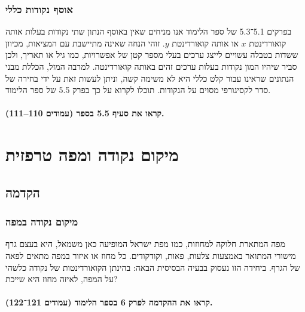 \documentclass[
]{book}
\begin{document}
\hypertarget{general-pos}{%
\subsection{אוסף נקודות כללי}\label{general-pos}}

בפרקים 5.1־5.3 של ספר הלימוד אנו מניחים שאין באוסף הנתון שתי נקודות בעלות אותה קואורדינטת \(x\) או אותה קואורדינטת \(y\). זוהי הנחה שאינה מתיישבת עם המציאות, מכיוון ששדות בטבלה עשויים לייצג ערכים בעלי מספר קטן של אפשרויות, כמו גיל או תאריך, ולכן סביר שיהיו המון נקודות בעלות ערכים זהים באותה קואורדינטה. למרבה המזל, הכללת מבני הנתונים שראינו עבור קלט כללי היא לא משימה קשה, וניתן לעשות זאת על ידי בחירה של סדר לקסיגורפי מסוים על הנקודות. תוכלו לקרוא על כך בפרק 5.5 של ספר הלימוד.

\hypertarget{ux5e7ux5e8ux5d0ux5d5-ux5d0ux5ea-ux5e1ux5e2ux5d9ux5e3-5.5-ux5d1ux5e1ux5e4ux5e8-ux5e2ux5deux5d5ux5d3ux5d9ux5dd-110111.}{%
\subsubsection*{קראו את סעיף 5.5 בספר (עמודים 110--111).}\label{ux5e7ux5e8ux5d0ux5d5-ux5d0ux5ea-ux5e1ux5e2ux5d9ux5e3-5.5-ux5d1ux5e1ux5e4ux5e8-ux5e2ux5deux5d5ux5d3ux5d9ux5dd-110111.}}

\hypertarget{point-location}{%
\chapter{מיקום נקודה ומפה טרפזית}\label{point-location}}

\hypertarget{preface}{%
\section{הקדמה}\label{preface}}

\hypertarget{point-on-map}{%
\subsection{מיקום נקודה במפה}\label{point-on-map}}

מפה המתארת חלוקה למחוזות, כמו מפת ישראל המופיעה כאן משמאל, היא בעצם גרף מישורי המתואר באמצעות צלעות, פאות, וקודקודים.
כל מחוז או איזור במפה מתאים לפאה של הגרף.
ביחידה הזו נעסוק בבעיה הבסיסית הבאה: בהינתן הקואורדינטות של נקודה כלשהי על המפה, לאיזה מחוז היא שייכת?

\hypertarget{ux5e7ux5e8ux5d0ux5d5-ux5d0ux5ea-ux5d4ux5d4ux5e7ux5d3ux5deux5d4-ux5dcux5e4ux5e8ux5e7-6-ux5d1ux5e1ux5e4ux5e8-ux5d4ux5dcux5d9ux5deux5d5ux5d3-ux5e2ux5deux5d5ux5d3ux5d9ux5dd-121122.}{%
\subsubsection*{קראו את ההקדמה לפרק 6 בספר הלימוד (עמודים 121־122).}\label{ux5e7ux5e8ux5d0ux5d5-ux5d0ux5ea-ux5d4ux5d4ux5e7ux5d3ux5deux5d4-ux5dcux5e4ux5e8ux5e7-6-ux5d1ux5e1ux5e4ux5e8-ux5d4ux5dcux5d9ux5deux5d5ux5d3-ux5e2ux5deux5d5ux5d3ux5d9ux5dd-121122.}}
\end{document}
